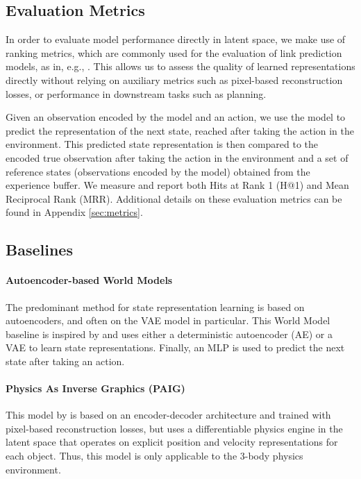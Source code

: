 \documentclass{article} %
\begin{document}
\subsection{Evaluation Metrics}
In order to evaluate model performance directly in latent space, we make use of ranking metrics, which are commonly used for the evaluation of link prediction models, as in, e.g., \citet{bordes2013translating}. This allows us to assess the quality of learned representations directly without relying on auxiliary metrics such as pixel-based reconstruction losses, or performance in downstream tasks such as planning.

Given an observation encoded by the model and an action, we use the model to predict the representation of the next state, reached after taking the action in the environment. This predicted state representation is then compared to the encoded true observation after taking the action in the environment and a set of reference states (observations encoded by the model) obtained from the experience buffer. We measure and report both Hits at Rank 1 (H@1) and Mean Reciprocal Rank (MRR). Additional details on these evaluation metrics can be found in Appendix \ref{sec:metrics}.

\subsection{Baselines}
\paragraph{Autoencoder-based World Models} The predominant method for state representation learning is based on autoencoders, and often on the VAE \citep{kingma2013auto,rezende2014stochastic} model in particular. This World Model baseline is inspired by \citet{ha2018world} and uses either a deterministic autoencoder (AE) or a VAE to learn state representations. Finally, an MLP is used to predict the next state after taking an action.

\paragraph{Physics As Inverse Graphics (PAIG)} This model by \citet{jaques2019physics} is based on an encoder-decoder architecture and trained with pixel-based reconstruction losses, but uses a differentiable physics engine in the latent space that operates on explicit position and velocity representations for each object. Thus, this model is only applicable to the 3-body physics environment.
\end{document}
